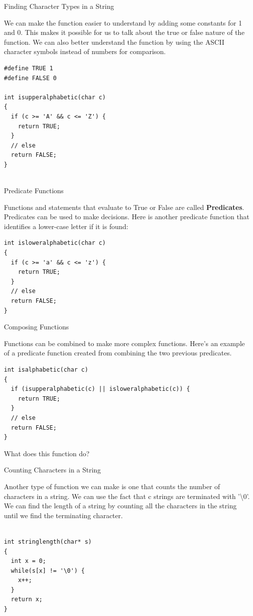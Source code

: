 \documentclass[10pt]{beamer}
\begin{document}
\begin{frame}[fragile]{Finding Character Types in a String}

We can make the function easier to understand by adding some constants for 1 and 0.  This makes it possible for us to talk about the true or false nature of the function.  We can also better understand the function by using the ASCII character symbols instead of numbers for comparison.

\begin{verbatim}
#define TRUE 1
#define FALSE 0

int isupperalphabetic(char c)
{
  if (c >= 'A' && c <= 'Z') {
    return TRUE;
  }
  // else
  return FALSE;
}


\end{verbatim}

\end{frame}
\begin{frame}[fragile]{Predicate Functions}

Functions and statements that evaluate to True or False are called \textbf{Predicates}.  Predicates can be used to make decisions.  Here is another predicate function that identifies a lower-case letter if it is found:

\begin{verbatim}
int isloweralphabetic(char c)
{
  if (c >= 'a' && c <= 'z') {
    return TRUE;
  }
  // else
  return FALSE;
}
\end{verbatim}

\end{frame}
\begin{frame}[fragile]{Composing Functions}

Functions can be combined to make more complex functions.  Here's an example of a predicate function created from combining the two previous predicates.

\begin{verbatim}
int isalphabetic(char c)
{
  if (isupperalphabetic(c) || isloweralphabetic(c)) {
    return TRUE;
  }
  // else
  return FALSE;
}
\end{verbatim}

What does this function do?

\end{frame}
\begin{frame}[fragile]{Counting Characters in a String}

Another type of function we can make is one that counts the number of characters in a string.  We can use the fact that c strings are terminated with '\textbackslash{0}'.  We can find the length of a string by counting all the characters in the string until we find the terminating character.

\begin{verbatim}

int stringlength(char* s)
{
  int x = 0;
  while(s[x] != '\0') {
    x++;
  }
  return x;
}

\end{verbatim}

\end{frame}
\end{document}
